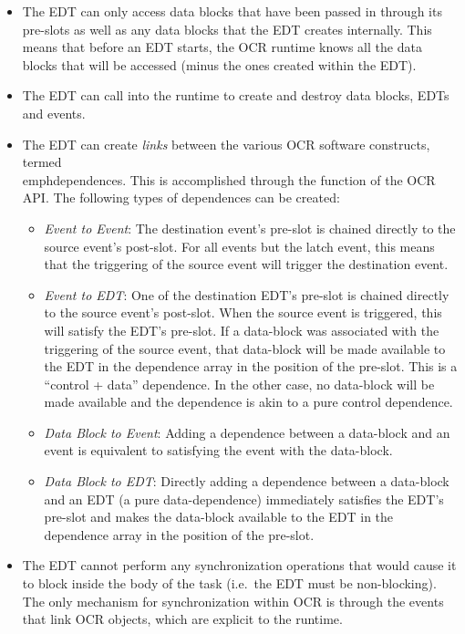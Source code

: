 \begin{itemize}
\item The EDT can only access data blocks that have been passed in
through its pre-slots as well as any data blocks that the EDT creates
internally. This means that before an EDT starts, the OCR runtime
knows all the data blocks that will be accessed (minus the ones
created within the EDT).

\item The EDT can call into the runtime to create and destroy data
blocks, EDTs and events.

\item The EDT can create \emph{links} between the various OCR
software constructs, termed \\emph{dependences}. This is
accomplished through the  function of the OCR
API. The following types of dependences can be created:
\begin{itemize}
\item \emph{Event to Event}: The destination event’s pre-slot is chained
directly to the source event’s post-slot.
For all events but the latch event, this means that the triggering of
the source event will trigger the destination event.

\item \emph{Event to EDT}: One of the destination EDT’s pre-slot is chained
directly to the source event’s post-slot. When the source event is
triggered, this will satisfy the EDT’s pre-slot. If a data-block was
associated with the triggering of the source event, that data-block
will be made available to the EDT in the dependence array in the
position of the pre-slot. This is a “control + data” dependence. In
the other case, no data-block will be made available and the
dependence is akin to a pure control dependence.

\item \emph{Data Block to Event}: Adding a dependence between a data-block and an
event is equivalent to satisfying the event with the data-block.

\item \emph{Data Block to EDT}: Directly adding a dependence between a data-block and
an EDT (a pure data-dependence) immediately satisfies the EDT’s
pre-slot and makes the data-block available to the EDT in the
dependence array in the position of the pre-slot.
\end{itemize}

\item The EDT cannot perform any synchronization operations that would
cause it to block inside the body of the task (i.e.\ the EDT must be
non-blocking). The only mechanism for synchronization within OCR is
through the events that link OCR objects, which are explicit to the
runtime.
\end{itemize}

